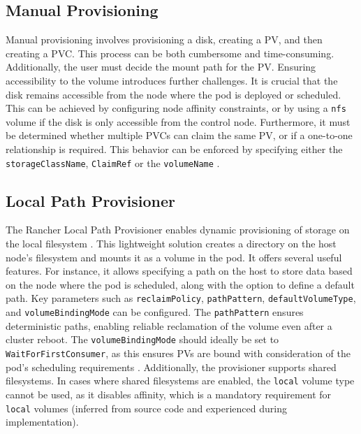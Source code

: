 \subsection{Manual Provisioning} 

Manual provisioning involves provisioning a disk, creating a PV, and then creating a PVC. This process can be both cumbersome and time-consuming. Additionally, the user must decide the mount path for the PV. Ensuring accessibility to the volume introduces further challenges. It is crucial that the disk remains accessible from the node where the pod is deployed or scheduled. This can be achieved by configuring node affinity constraints, or by using a \texttt{nfs} volume if the disk is only accessible from the control node. Furthermore, it must be determined whether multiple PVCs can claim the same PV, or if a one-to-one relationship is required. This behavior can be enforced by specifying either the \texttt{storageClassName}, \texttt{ClaimRef} or the \texttt{volumeName} \cite{kubernetesPersistentVolumes}.

\subsection{Local Path Provisioner} 

The Rancher Local Path Provisioner enables dynamic provisioning of storage on the local filesystem \cite{rancher_local_path_provisioner}. This lightweight solution creates a directory on the host node's filesystem and mounts it as a volume in the pod. It offers several useful features. For instance, it allows specifying a path on the host to store data based on the node where the pod is scheduled, along with the option to define a default path. Key parameters such as \texttt{reclaimPolicy}, \texttt{pathPattern}, \texttt{defaultVolumeType}, and \texttt{volumeBindingMode} can be configured. The \texttt{pathPattern} ensures deterministic paths, enabling reliable reclamation of the volume even after a cluster reboot. The \texttt{volumeBindingMode} should ideally be set to \texttt{WaitForFirstConsumer}, as this ensures PVs are bound with consideration of the pod's scheduling requirements \cite{kubernetes_storage_classes}. Additionally, the provisioner supports shared filesystems. In cases where shared filesystems are enabled, the \texttt{local} volume type cannot be used, as it disables affinity, which is a mandatory requirement for \texttt{local} volumes (inferred from source code and experienced during implementation).

